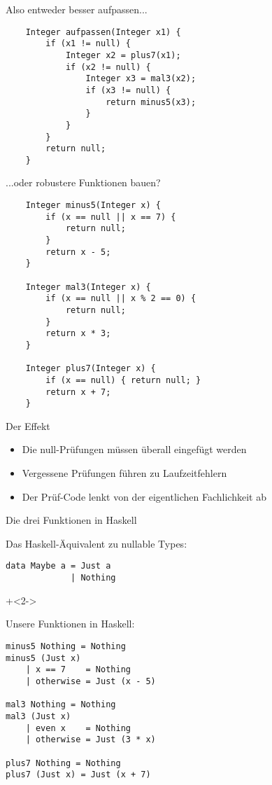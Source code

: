 \begin{frame}[fragile]{Also entweder besser aufpassen...}

\begin{lstlisting}
    Integer aufpassen(Integer x1) {
        if (x1 != null) {
            Integer x2 = plus7(x1);
            if (x2 != null) {
                Integer x3 = mal3(x2);
                if (x3 != null) {
                    return minus5(x3);
                }
            }
        }
        return null;
    }
\end{lstlisting}


\end{frame}

\begin{frame}[fragile]{...oder robustere Funktionen bauen?}
\begin{lstlisting}
    Integer minus5(Integer x) {
        if (x == null || x == 7) {
            return null;
        }
        return x - 5;
    }

    Integer mal3(Integer x) {
        if (x == null || x % 2 == 0) {
            return null;
        }
        return x * 3;
    }

    Integer plus7(Integer x) {
        if (x == null) { return null; }
        return x + 7;
    }
\end{lstlisting}
\end{frame}

\begin{frame}[fragile]{Der Effekt}
\begin{itemize}
\item Die null-Prüfungen müssen überall eingefügt werden
\item Vergessene Prüfungen führen zu Laufzeitfehlern
\item Der Prüf-Code lenkt von der eigentlichen Fachlichkeit ab
\end{itemize}
\end{frame}


\begin{frame}[fragile]{Die drei Funktionen in Haskell}

Das Haskell-Äquivalent zu nullable Types:

\begin{lstlisting}
data Maybe a = Just a
             | Nothing
\end{lstlisting}

\onslide+<2->

Unsere Funktionen in Haskell:

\begin{lstlisting}
minus5 Nothing = Nothing
minus5 (Just x)
    | x == 7    = Nothing
    | otherwise = Just (x - 5)

mal3 Nothing = Nothing
mal3 (Just x)
    | even x    = Nothing
    | otherwise = Just (3 * x)

plus7 Nothing = Nothing
plus7 (Just x) = Just (x + 7)
\end{lstlisting}
\end{frame}

